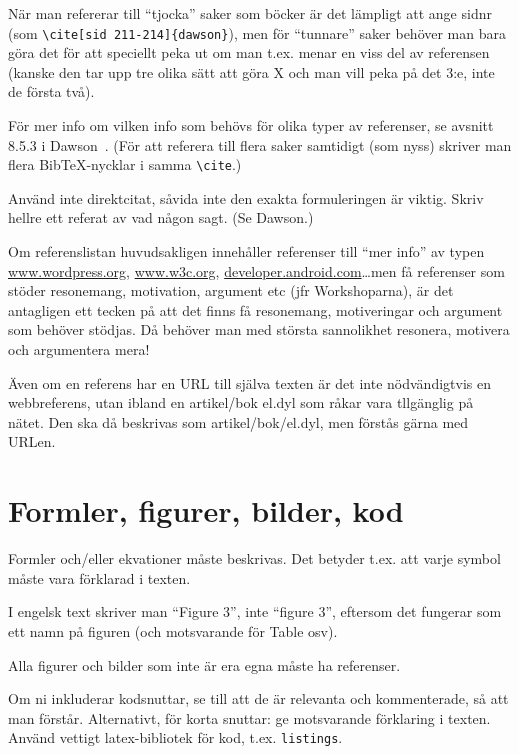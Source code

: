 \documentclass[a4paper,12pt]{article}
\begin{document}
När man refererar till ``tjocka'' saker som böcker är det lämpligt att ange sidnr
(som \verb|\cite[sid 211-214]{dawson}|), men för ``tunnare'' saker behöver man bara göra det för att speciellt peka ut om man t.ex. menar en viss del av referensen (kanske den tar upp tre olika sätt att göra X och man vill peka på det 3:e, inte de första två).

För mer info om vilken info som behövs för olika typer av referenser, se avsnitt 8.5.3 i Dawson~\cite{dawson:projects-in-computing,dawson:projects-in-computing-old}. (För att referera till flera saker samtidigt (som nyss) skriver man flera BibTeX-nycklar i samma \verb|\cite|.)

Använd inte direktcitat, såvida inte den exakta formuleringen är viktig.  Skriv hellre ett referat av vad någon sagt. (Se Dawson.)

Om referenslistan huvudsakligen innehåller referenser till ``mer info'' av typen
\url{www.wordpress.org}, \url{www.w3c.org}, \url{developer.android.com}\ldots men få referenser som stöder resonemang, motivation, argument etc (jfr Workshoparna), är det antagligen ett tecken på att det finns få resonemang, motiveringar och argument som behöver stödjas. Då behöver man med största sannolikhet resonera, motivera och argumentera mera!

Även om en referens har en URL till själva texten är det inte nödvändigtvis en webbreferens, utan ibland en artikel/bok el.dyl som råkar vara tllgänglig på nätet. Den ska då beskrivas som artikel/bok/el.dyl, men förstås gärna med URLen.

\section{Formler, figurer, bilder, kod}
\label{sec:forml-figur-bild}

Formler och/eller ekvationer måste beskrivas.  Det betyder t.ex. att varje symbol måste vara förklarad i texten.

I engelsk text skriver man ``Figure 3'', inte ``figure 3'', eftersom det fungerar som ett namn på figuren (och motsvarande för Table osv).

Alla figurer och bilder som inte är era egna måste ha referenser.

Om ni inkluderar kodsnuttar, se till att de är relevanta och kommenterade, så att man förstår.  Alternativt, för korta snuttar: ge motsvarande förklaring i texten.
Använd vettigt latex-bibliotek för kod, t.ex. \texttt{listings}.
\end{document}
